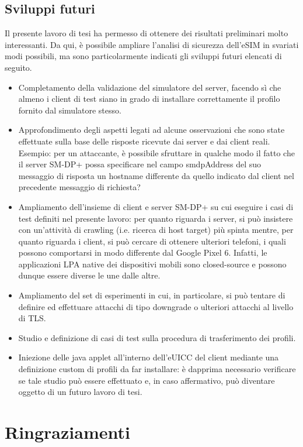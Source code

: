 \documentclass[10pt, oneside]{book}
\begin{document}
\section{Sviluppi futuri}
Il presente lavoro di tesi ha permesso di ottenere dei risultati preliminari molto interessanti. Da qui, è possibile ampliare l'analisi di sicurezza dell'eSIM in svariati modi possibili, ma sono particolarmente indicati gli sviluppi futuri elencati di seguito.
\begin{itemize}
\item Completamento della validazione del simulatore del server, facendo sì che almeno i client di test siano in grado di installare correttamente il profilo fornito dal simulatore stesso.
\item Approfondimento degli aspetti legati ad alcune osservazioni che sono state effettuate sulla base delle risposte ricevute dai server e dai client reali. Esempio: per un attaccante, è possibile sfruttare in qualche modo il fatto che il server SM-DP+ possa specificare nel campo smdpAddress del suo messaggio di risposta un hostname differente da quello indicato dal client nel precedente messaggio di richiesta?
\item Ampliamento dell'insieme di client e server SM-DP+ su cui eseguire i casi di test definiti nel presente lavoro: per quanto riguarda i server, si può insistere con un'attività di crawling (i.e. ricerca di host target) più spinta mentre, per quanto riguarda i client, si può cercare di ottenere ulteriori telefoni, i quali possono comportarsi in modo differente dal Google Pixel 6. Infatti, le applicazioni LPA native dei dispositivi mobili sono closed-source e possono dunque essere diverse le une dalle altre.
\item Ampliamento del set di esperimenti in cui, in particolare, si può tentare di definire ed effettuare attacchi di tipo downgrade o ulteriori attacchi al livello di TLS.
\item Studio e definizione di casi di test sulla procedura di trasferimento dei profili.
\item Iniezione delle java applet all'interno dell'eUICC del client mediante una definizione custom di profili da far installare: è dapprima necessario verificare se tale studio può essere effettuato e, in caso affermativo, può diventare oggetto di un futuro lavoro di tesi.
\end{itemize}



\chapter*{Ringraziamenti}
\pagestyle{fancy} %
\end{document}
